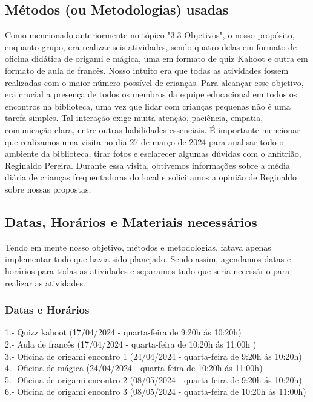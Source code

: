 \documentclass[a4paper,12pt]{article}
\begin{document}
\subsection{\Large{Métodos (ou Metodologias) usadas}}
Como mencionado anteriormente no tópico "3.3 Objetivos", o nosso propósito, enquanto grupo, era realizar seis atividades, sendo quatro delas em formato de oficina didática de origami e mágica, uma em formato de quiz Kahoot e outra em formato de aula de francês. Nosso intuito era que todas as atividades fossem realizadas com o maior número possível de crianças. Para alcançar esse objetivo, era crucial a presença de todos os membros da equipe educacional em todos os encontros na biblioteca, uma vez que lidar com crianças pequenas não é uma tarefa simples. Tal interação exige muita atenção, paciência, empatia, comunicação clara, entre outras habilidades essenciais.
\newpage
É importante mencionar que realizamos uma visita no dia 27 de março de 2024 para analisar todo o ambiente da biblioteca, tirar fotos e esclarecer algumas dúvidas com o anfitrião, Reginaldo Pereira. Durante essa visita, obtivemos informações sobre a média diária de crianças frequentadoras do local e solicitamos a opinião de Reginaldo sobre nossas propostas.
\vspace{0.2cm}

\subsection{\Large{Datas, Horários e Materiais necessários}}
Tendo em mente nosso objetivo, métodos e metodologias, fatava apenas implementar tudo que havia sido planejado. Sendo assim, agendamos datas e horários para todas as atividades e separamos tudo que seria necessário para realizar as atividades.\vspace{0.2cm}\\

\subsubsection{Datas e Horários}
1.- Quizz kahoot (17/04/2024 - quarta-feira de 9:20h ás 10:20h)\\
2.- Aula de francês (17/04/2024 - quarta-feira de 10:20h ás 11:00h )\\
3.- Oficina de origami encontro 1 (24/04/2024 - quarta-feira de 9:20h ás 10:20h)\\
4.- Oficina de mágica (24/04/2024 - quarta-feira de 10:20h ás 11:00h)\\
5.- Oficina de origami encontro 2 (08/05/2024 - quarta-feira de 9:20h ás 10:20h)\\
6.- Oficina de origami encontro 3 (08/05/2024 - quarta-feira de 10:20h ás 11:00h)
\end{document}
